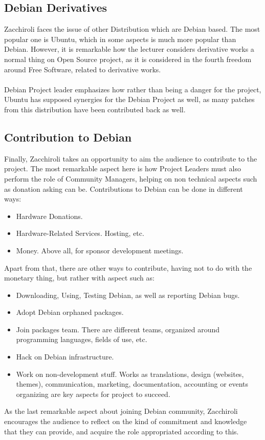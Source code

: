 \documentclass[11pt]{article}
\begin{document}
\subsection{Debian Derivatives}
Zacchiroli faces the issue of other Distribution which are Debian based. The most popular one is Ubuntu, which in some aspects is much more popular than Debian. However, it is remarkable how the lecturer considers derivative works a normal thing on Open Source project, as it is considered in the fourth freedom around Free Software, related to derivative works.\\
\\
Debian Project leader emphasizes how rather than being a danger for the project, Ubuntu has supposed synergies for the Debian Project as well, as many patches from this distribution have been contributed back as well.

\subsection{Contribution to Debian}
Finally, Zacchiroli takes an opportunity to aim the audience to contribute to the project. The most remarkable aspect here is how Project Leaders must also perform the role of Community Managers, helping on non technical aspects such as donation asking can be. Contributions to Debian can be done in different ways:
\begin{itemize}\itemsep0pt
\item{Hardware Donations}. 
\item{Hardware-Related Services}. Hosting, etc.
\item{Money}. Above all, for sponsor development meetings.
\end{itemize}
Apart from that, there are other ways to contribute, having not to do with the monetary thing, but rather with aspect such as:
\begin{itemize}\itemsep0pt
\item{Downloading, Using, Testing Debian, as well as reporting Debian bugs}. 
\item{Adopt Debian orphaned packages}.
\item{Join packages team}. There are different teams, organized around programming languages, fields of use, etc. 
\item{Hack on Debian infrastructure}.
\item{Work on non-development stuff}.  Works as translations, design (websites, themes), communication, marketing, documentation, accounting or events organizing are key aspects for project to succeed.
\end{itemize}
As the last remarkable aspect about joining Debian community, Zacchiroli encourages the audience to reflect on the kind of commitment and knowledge that they can provide, and acquire the role appropriated according to this.
\end{document}
